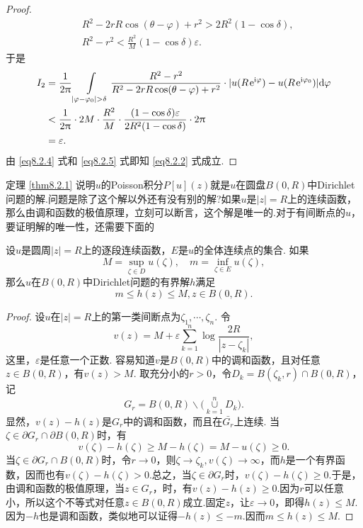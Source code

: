 \begin{proof}
\begin{align*}
&R^2-2rR\cos(\theta-\varphi)+r^2>2R^2(1-\cos\delta),\\
&R^2-r^2<\frac{R^2}M(1-\cos\delta)\varepsilon.
\end{align*}
于是
\begin{equation}\label{eq8.2.5}
\begin{aligned}
I_2&=\frac1{2\pi}\int\limits_{|\varphi-\varphi_0|>\delta}\frac{R^2-r^2}{R^2-2rR
\cos(\theta-\varphi)+r^2}\cdot|u(R\ee^{\ii\varphi})-u(R\ee^{\ii\varphi_0})|\textrm d\varphi\\
&<\frac1{2\pi}\cdot2M\cdot\frac{R^2}M\cdot\frac{(1-\cos\delta)\varepsilon}
{2R^2(1-\cos\delta)}\cdot2\pi\\
&=\varepsilon.
\end{aligned}
\end{equation}
由 \eqref{eq8.2.4} 式和 \eqref{eq8.2.5} 式即知 \eqref{eq8.2.2} 式成立.
\end{proof}

定理 \ref{thm8.2.1} 说明$u$的Poisson积分$P[u](z)$就是$u$在圆盘$B(0,R)$中Dirichlet问题的解.问题是除了这个解以外还有没有别的解?如果$u$是$|z|=R$上的连续函数，那么由调和函数的极值原理，立刻可以断言，这个解是唯一的.对于有间断点的$u$，要证明解的唯一性，还需要下面的
\begin{prop}\label{prop8.2.2}
设$u$是圆周$|z|=R$上的逐段连续函数，$E$是$u$的全体连续点的集合. 如果
\[M=\sup_{\zeta\in D}u(\zeta),\quad m=\inf_{\zeta\in E}u(\zeta),\]
那么$u$在$B(0,R)$中Dirichlet问题的有界解$h$满足
\[m\le h(z)\le M,z\in B(0,R).\]
\end{prop}
\begin{proof}
设$u$在$|z|=R$上的第一类间断点为$\zeta_1,\cdots,\zeta_n$. 令
\[v(z)=M+\varepsilon\sum_{k=1}^n\log\frac{2R}{|z-\zeta_k|},\]
这里，$\varepsilon$是任意一个正数. 容易知道$v$是$B(0,R)$中的调和函数，且对任意$z\in B(0,R)$，有$v(z)>M$. 取充分小的$r>0$，令$D_k=B(\zeta_k,r)\cap B(0,R)$，记
\[G_r=B(0,R)\backslash\big(\operatorname*{\cup}_{k=1}^nD_k\big).\]
显然，$v(z)-h(z)$是$G_r$中的调和函数，而且在$\bar{G_r}$上连续. 当$\zeta\in\partial G_r\cap\partial B(0,R)$时，有
\[v(\zeta)-h(\zeta)\ge M-h(\zeta)=M-u(\zeta)\ge0.\]
当$\zeta\in\partial G_r\cap B(0,R)$时，令$r\to0$，则$\zeta\to \zeta_k,v(\zeta)\to\infty$，而$h$是一个有界函数，因而也有$v(\zeta)-h(\zeta)>0$.总之，当$\zeta\in\partial G_r$时，$v(\zeta)-h(\zeta)\ge0$.于是，由调和函数的极值原理，当$z\in G_r$，时，有$v(z)-h(z)\ge0$.因为$r$可以任意小，所以这个不等式对任意$z\in B(0,R)$成立.固定$z$，让$\varepsilon\to0$，即得$h(z)\le M$.因为$-h$也是调和函数，类似地可以证得$-h(z)\le -m$.因而$m\le h(z)\le M$.
\end{proof}

